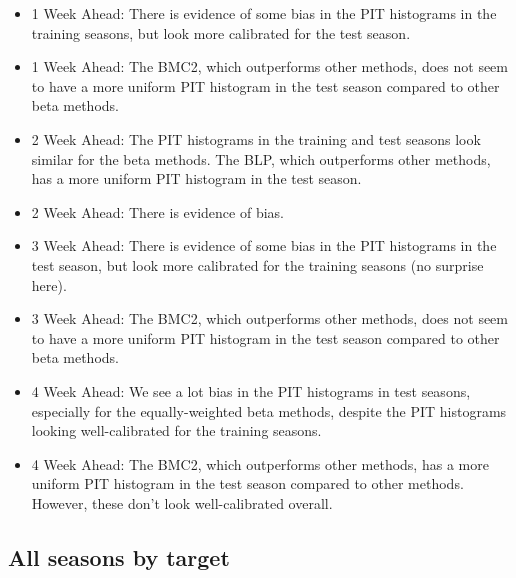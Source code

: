 \documentclass[
]{article}
\begin{document}
\begin{itemize}
\item 1 Week Ahead: There is evidence of some bias in the PIT histograms in the training seasons, but look more calibrated for the test season.
\item 1 Week Ahead: The BMC2, which outperforms other methods, does not seem to have a more uniform PIT histogram in the test season compared to other beta methods.
\item 2 Week Ahead: The PIT histograms in the training and test seasons look similar for the beta methods. The BLP, which outperforms other methods, has a more uniform PIT histogram in the test season.
\item 2 Week Ahead: There is evidence of bias.
\item 3 Week Ahead: There is evidence of some bias in the PIT histograms in the test season, but look more calibrated for the training seasons (no surprise here).
\item 3 Week Ahead: The BMC2, which outperforms other methods, does not seem to have a more uniform PIT histogram in the test season compared to other beta methods.
\item 4 Week Ahead: We see a lot bias in the PIT histograms in test seasons, especially for the equally-weighted beta methods, despite the PIT histograms looking well-calibrated for the training seasons.
\item 4 Week Ahead: The BMC2, which outperforms other methods, has a more uniform PIT histogram in the test season compared to other methods. However, these don't look well-calibrated overall.
\end{itemize}

\hypertarget{all-seasons-by-target}{%
\subsection{All seasons by target}\label{all-seasons-by-target}}
\end{document}
